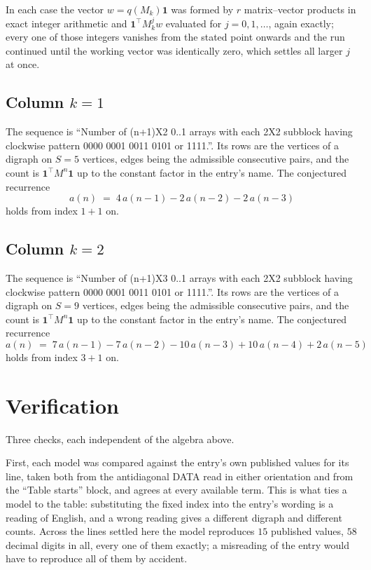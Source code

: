 \documentclass[11pt,a4paper]{article}
\theoremstyle{plain}
\theoremstyle{definition}
\begin{document}
In each case the vector $w=q(M_k)\mathbf{1}$ was formed by $r$ matrix--vector products in
exact integer arithmetic and $\mathbf{1}^{\!\top}M_k^{j}w$ evaluated for $j=0,1,\dots$,
again exactly; every one of those integers vanishes from the stated point onwards and the run
continued until the working vector was identically zero, which settles all larger $j$ at once.

\subsection*{Column $k$$=1$}
The sequence is ``Number of (n+1)X2 0..1 arrays with each 2X2 subblock having clockwise pattern 0000 0001 0011 0101 or 1111.''. Its rows are the vertices of a digraph on
$S=5$ vertices, edges being the admissible consecutive pairs, and the count is
$\mathbf{1}^{\!\top}M^{n}\mathbf{1}$ up to the constant factor in the entry's name.
The conjectured recurrence
\[
a(n)\;=\;4\,a(n-1) - 2\,a(n-2) - 2\,a(n-3)
\]
holds from index $1+1$ on.

\subsection*{Column $k$$=2$}
The sequence is ``Number of (n+1)X3 0..1 arrays with each 2X2 subblock having clockwise pattern 0000 0001 0011 0101 or 1111.''. Its rows are the vertices of a digraph on
$S=9$ vertices, edges being the admissible consecutive pairs, and the count is
$\mathbf{1}^{\!\top}M^{n}\mathbf{1}$ up to the constant factor in the entry's name.
The conjectured recurrence
\[
a(n)\;=\;7\,a(n-1) - 7\,a(n-2) - 10\,a(n-3) + 10\,a(n-4) + 2\,a(n-5)
\]
holds from index $3+1$ on.

\section{Verification}

Three checks, each independent of the algebra above.

First, each model was compared against the entry's own published values for its line, taken
both from the antidiagonal DATA read in either orientation and from the ``Table starts''
block, and agrees at every available term. This is what ties a model to the table:
substituting the fixed index into the entry's wording is a reading of English, and a wrong
reading gives a different digraph and different counts. Across the lines settled here the
model reproduces $15$ published values, $58$ decimal digits in all, every one of
them exactly; a misreading of the entry would have to reproduce all of them by accident.
\end{document}
